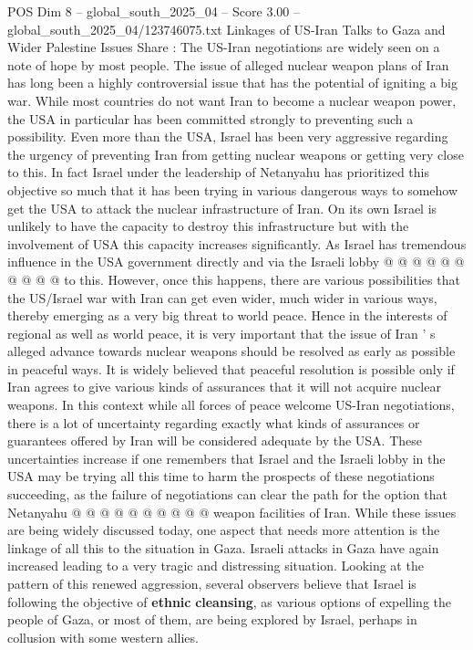 \begin{textsample}{POS Dim 8 – global\_south\_2025\_04 – Score 3.00 – global\_south\_2025\_04/123746075.txt}  \label{ex:f8_pos_170}
Linkages of US-Iran Talks to Gaza and Wider Palestine Issues Share : The US-Iran negotiations are widely seen on a note of hope by most people.
The issue of alleged nuclear weapon plans of Iran has long been a highly controversial issue that has the potential of igniting a big war.
While most countries do not want Iran to become a nuclear weapon power, the USA in particular has been committed strongly to preventing such a possibility.
Even more than the USA, Israel has been very aggressive regarding the urgency of preventing Iran from getting nuclear weapons or getting very close to this.
In fact Israel under the leadership of Netanyahu has prioritized this objective so much that it has been trying in various dangerous ways to somehow get the USA to attack the nuclear infrastructure of Iran.
On its own Israel is unlikely to have the capacity to destroy this infrastructure but with the involvement of USA this capacity increases significantly.
As Israel has tremendous influence in the USA government directly and via the Israeli lobby @ @ @ @ @ @ @ @ @ @ to this.
However, once this happens, there are various possibilities that the US/Israel war with Iran can get even wider, much wider in various ways, thereby emerging as a very big threat to world peace.
Hence in the interests of regional as well as world peace, it is very important that the issue of Iran ' s alleged advance towards nuclear weapons should be resolved as early as possible in peaceful ways.
It is widely believed that peaceful resolution is possible only if Iran agrees to give various kinds of assurances that it will not acquire nuclear weapons.
In this context while all forces of peace welcome US-Iran negotiations, there is a lot of uncertainty regarding exactly what kinds of assurances or guarantees offered by Iran will be considered adequate by the USA.
These uncertainties increase if one remembers that Israel and the Israeli lobby in the USA may be trying all this time to harm the prospects of these negotiations succeeding, as the failure of negotiations can clear the path for the option that Netanyahu @ @ @ @ @ @ @ @ @ @ weapon facilities of Iran.
While these issues are being widely discussed today, one aspect that needs more attention is the linkage of all this to the situation in Gaza.
Israeli attacks in Gaza have again increased leading to a very tragic and distressing situation.
Looking at the pattern of this renewed aggression, several observers believe that Israel is following the objective of \textbf{ethnic} \textbf{cleansing}, as various options of expelling the people of Gaza, or most of them, are being explored by Israel, perhaps in collusion with some western allies.

\end{textsample}

